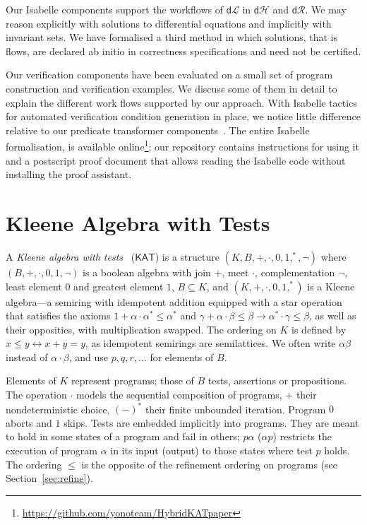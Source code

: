 \documentclass[envcountsame,envcountsect]{llncs}
\newcommand{\KAT}{\mathsf{KAT}}
\newcommand{\dL}{\mathsf{d}\mathcal{L}}
\newcommand{\dH}{\mathsf{d}\mathcal{H}}
\newcommand{\dR}{\mathsf{d}\mathcal{R}}
\begin{document}
Our Isabelle components support the  workflows of $\dL$ in $\dH$
and $\dR$. We may reason explicitly with solutions to differential
equations and implicitly with invariant sets. We have formalised a third
method in which solutions, that is flows, are declared ab initio in
correctness specifications and need not be certified.

Our verification components have been evaluated on a small set
of program construction and verification examples. We discuss some of
them in detail to explain the different work flows supported by our
approach. With Isabelle tactics for automated verification condition
generation in place, we notice little difference relative to our
predicate transformer components~\cite{MuniveS19}.  The entire
Isabelle formalisation, is available online\footnote{\url{https://github.com/yonoteam/HybridKATpaper}};
our repository contains instructions for using it and a postscript
proof document that allows reading the Isabelle code without
installing the proof assistant.



\section{Kleene Algebra with Tests}\label{sec:kat} 

A \emph{Kleene algebra with tests}~\cite{Kozen97} ($\KAT$) is a
structure $(K,B,+,\cdot,0,1,^\ast,\neg)$ where $(B,+,\cdot,0,1,\neg)$
is a boolean algebra with join $+$, meet $\cdot$, complementation
$\neg$, least element $0$ and greatest element $1$, $B\subseteq K$,
and $(K,+,\cdot,0,1,^\ast)$ is a Kleene algebra---a semiring with
idempotent addition equipped with a star operation that satisfies the
axioms $1+\alpha\cdot\alpha^\ast \le \alpha^\ast$ and
$\gamma+\alpha\cdot \beta\le \beta\rightarrow \alpha^\ast \cdot
\gamma\le \beta$,
as well as their opposities, with multiplication swapped.  The
ordering on $K$ is defined by $x\le y\leftrightarrow x+y=y$, as
idempotent semirings are semilattices. We often write $\alpha\beta$
instead of $\alpha\cdot\beta$, and use $p,q,r,\dots$ for elements of $B$.

Elements of $K$ represent programs; those of $B$ tests, assertions or
propositions.  The operation $\cdot$ models the sequential composition
of programs, $+$ their nondeterministic choice, $(-)^\ast$ their
finite unbounded iteration. Program $0$ aborts and $1$ skips.  Tests
are embedded implicitly into programs. They are meant to hold in some
states of a program and fail in others; $p\alpha$ ($\alpha p$)
restricts the execution of program $\alpha$ in its input (output) to
those states where test $p$ holds. The ordering $\le$ is the opposite
of the refinement ordering on programs (see Section~\ref{sec:refine}).
\end{document}
